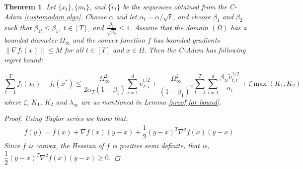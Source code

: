\documentclass[12pt]{article}
\newtheorem{thm}{Theorem}[section]
\begin{document}
\begin{thm}\label{custom adam bound}
Let $\{x_t\}, \{m_t\}$, and $\{\tilde{v}_t\}$ be the sequences obtained from the C-Adam \ref{customadam algo}. Choose $\alpha$ and let $\alpha_t=\alpha/\sqrt{t}$, and choose $\beta_1$ and $\beta_2$ such that $\beta_{1t} \leq \beta_1, \; t \in [T]$, and $\frac{\beta_1}{\sqrt{\beta_2}} \leq 1$. Assume that the domain $(\Omega)$ has a bounded diameter $\Omega_{\infty}$ and the convex function $f$ has bounded gradients $\lVert \nabla f_t (x) \rVert \leq M$ for all $t \in [T]$ and $x \in \Omega$. Then the C-Adam has following regret bound:

 $$\sum_{t=1}^T f_{t}(x_{t}) - f_{t}(x^{*}) \leq \dfrac{\Omega_{\infty}^{2}}{2\alpha_{T}(1-\beta_{1})}\sum_{i=1}^{d}{\tilde{v}_{T,i}^{1/2}} + \dfrac{\Omega_{\infty}^{2}}{(1-\beta_{1})^{2}}\sum_{t=1}^{T}{\sum_{i=1}^{d}{\dfrac{\beta_{1t}\tilde{v}_{t,i}^{1/2}}{\alpha_{t}}}} +\zeta \max(K_1, K_2)$$
 where $\zeta$, $K_1$, $K_2$ and $\lambda_\infty$ are as mentioned in Lemma \ref{proof for bound}.



\begin{proof}
    Using Taylor series we know that,
\begin{align*}
f(y) = f(x) + \nabla f(x)(y - x) + \dfrac{1}{2}(y-x)^{T}\nabla^{2}f(x)(y-x)
\end{align*}
Since $f$ is convex, the Hessian of $f$ is positive semi definite, that is, $\dfrac{1}{2}(y-x)^{T}\nabla^{2}f(x)(y-x) \geq  0$.


\end{proof}
\end{thm}
\end{document}
